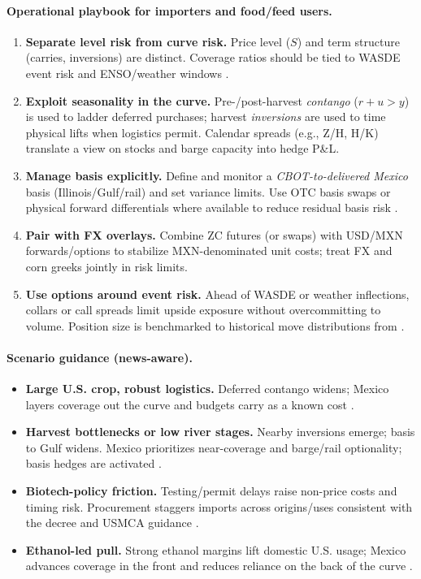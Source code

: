 \documentclass[11pt,a4paper]{article} %
\begin{document}
\paragraph{Operational playbook for importers and food/feed users.}
\begin{enumerate}
  \item \textbf{Separate level risk from curve risk.} Price level (\(S\)) and term structure (carries, inversions) are distinct. Coverage ratios should be tied to WASDE event risk and ENSO/weather windows \citep{noaa_enso_discussion,usda_wasde}.
  \item \textbf{Exploit seasonality in the curve.} Pre-/post-harvest \emph{contango} (\(r+u>y\)) is used to ladder deferred purchases; harvest \emph{inversions} are used to time physical lifts when logistics permit. Calendar spreads (e.g., Z/H, H/K) translate a view on stocks and barge capacity into hedge P\&L.
  \item \textbf{Manage basis explicitly.} Define and monitor a \emph{CBOT-to-delivered Mexico} basis (Illinois/Gulf/rail) and set variance limits. Use OTC basis swaps or physical forward differentials where available to reduce residual basis risk \citep{ams_gtr_2023}.
  \item \textbf{Pair with FX overlays.} Combine ZC futures (or swaps) with USD/MXN forwards/options to stabilize MXN-denominated unit costs; treat FX and corn greeks jointly in risk limits.
  \item \textbf{Use options around event risk.} Ahead of WASDE or weather inflections, collars or call spreads limit upside exposure without overcommitting to volume. Position size is benchmarked to historical move distributions from \citep{usda_wasde}.
\end{enumerate}

\paragraph{Scenario guidance (news-aware).}
\begin{itemize}
  \item \textbf{Large U.S. crop, robust logistics.} Deferred contango widens; Mexico layers coverage out the curve and budgets carry as a known cost \citep{ers_feedgrains_outlook,reuters_record_crop_2025}.
  \item \textbf{Harvest bottlenecks or low river stages.} Nearby inversions emerge; basis to Gulf widens. Mexico prioritizes near-coverage and barge/rail optionality; basis hedges are activated \citep{ams_gtr_2023}.
  \item \textbf{Biotech-policy friction.} Testing/permit delays raise non-price costs and timing risk. Procurement staggers imports across origins/uses consistent with the decree and USMCA guidance \citep{fas_mexico_decree_2023,ustr_usmca_biotech_win_2024,fas_mexico_grain_annual_2025}.
  \item \textbf{Ethanol-led pull.} Strong ethanol margins lift domestic U.S. usage; Mexico advances coverage in the front and reduces reliance on the back of the curve \citep{ers_ethanol_40}.
\end{itemize}
\end{document}
